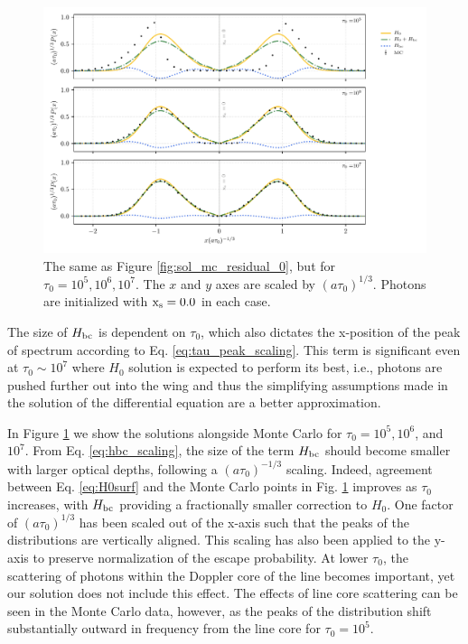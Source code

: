 \documentclass{aastex63}
\begin{document}
 \begin{figure}
    \centering
    \includegraphics{tau_threepanel.pdf}
    \caption{The same as Figure \ref{fig:sol_mc_residual_0}, but for $\tau_0 = 10^5, 10^6, 10^7$. The $x$ and $y$ axes are scaled by $(a\tau_0)^{1/3}$. Photons are initialized with $\rm x_s = 0.0$ in each case.} 
    \label{fig:sol_mc_tau}
\end{figure}

The size of $H_{\rm bc}$ is dependent on $\tau_0$, which also dictates the x-position of the peak of spectrum according to Eq. \ref{eq:tau_peak_scaling}. This term is significant even at $\tau_0 {\sim} 10^7$ where $H_0$ solution is expected to perform its best, i.e., photons are pushed further out into the wing and thus the simplifying assumptions made in the solution of the differential equation are a better approximation. 

In Figure \ref{fig:sol_mc_tau} we show the solutions alongside Monte Carlo for $\tau_0=10^5, 10^6$, and $10^7$. From Eq. \ref{eq:hbc_scaling}, the size of the term $H_{\rm bc}$ should become smaller with larger optical depths, following a $(a\tau_0)^{-1/3}$ scaling. Indeed, agreement between Eq. \ref{eq:H0surf} and the Monte Carlo points in Fig. \ref{fig:sol_mc_tau} improves as $\tau_0$ increases, with $H_{\rm bc}$ providing a fractionally smaller correction to $H_0$. One factor of $(a\tau_0)^{1/3}$ has been scaled out of the x-axis such that the peaks of the distributions are vertically aligned. This scaling has also been applied to the y-axis to preserve normalization of the escape probability. At lower $\tau_0$, the scattering of photons within the Doppler core of the line becomes important, yet our solution does not include this effect. The effects of line core scattering can be seen in the Monte Carlo data, however, as the peaks of the distribution shift substantially outward in frequency from the line core for $\tau_0 = 10^5$.
 
\end{document}
